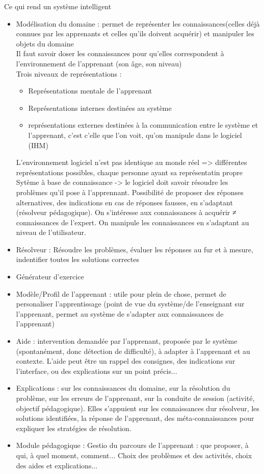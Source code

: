 
Ce qui rend un système intelligent

\begin{itemize}
	\item Modélisation du domaine : permet de représenter les connaissances(celles déjà connues par les apprenants et celles qu'ils doivent acquérir) et manipuler les objets du domaine\\
	Il faut savoir doser les connaissances pour qu'elles correspondent à l'environnement de l'apprenant (son âge, son niveau)\\
	Trois niveaux de représentations :
	\begin{itemize}
		\item Représentations mentale de l'apprenant
		\item Représentations internes destinées au système
		\item représentations externes destinées à la communication entre le système et l'apprenant, c'est c'elle que l'on voit, qu'on manipule dans le logiciel (IHM)
	\end{itemize}
	L'environnement logiciel n'est pas identique au monde réel => différentes représentations possibles, chaque personne ayant sa représentatin propre\\
	Sytème à base de connaissance -> le logiciel doit savoir résoudre les problèmes qu'il pose à l'apprennant. Possibilité de proposer des réponses alternatives, des indications en cas de réponses fausses, en s'adaptant (résolveur pédagogique). On s'intéresse aux connaissances à acquérir ≠ connaissances de l'expert. On manipule les connaissances en s'adaptant au niveau de l'utilisateur.
	\item Résolveur : Résoudre les problèmes, évaluer les réponses au fur et à mesure, indentifier toutes les solutions correctes

	\item Générateur d'exercice
	\item Modèle/Profil de l'apprenant : utile pour plein de chose, permet de personaliser l'apprentissage (point de vue du système/de l'enseignant sur l'apprenant, permet au système de s'adapter aux connaissances de l'apprenant)
	\item Aide : intervention demandée par l'apprenant, proposée par le système (spontanément, donc détection de difficulté), à adapter à l'apprenant et au contexte. L'aide peut être un rappel des consignes, des indications sur l'interface, ou des explications sur un point précis...
	\item Explications : sur les connaissances du domaine, sur la résolution du problème, sur les erreurs de l'apprenant, sur la conduite de session (activité, objectif pédagogique). Elles s'appuient sur les connaissances dur résolveur, les solutions identifiées, la réponse de l'apprenant, des méta-connaissances pour expliquer les stratégies de résolution.
	\item Module pédagogique : Gestio du parcours de l'apprenant : que proposer, à qui, à quel moment, comment... Choix des problèmes et des activités, choix des aides et explications...

\end{itemize}

\vskip 4cm

